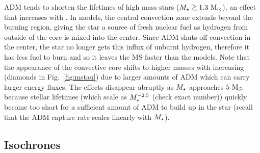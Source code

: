 \documentclass[useAMS,usenatbib]{mnras}
\begin{document}
ADM tends to shorten the lifetimes of high mass stars ($M_{\star} \gtrsim 1.3 \ \mathrm{M}_{\odot}$), an effect that increases with \gammaB. In \nodm models, the central convection zone extends beyond the burning region, giving the star a source of fresh nuclear fuel as hydrogen from outside of the core is mixed into the center. Since ADM shuts off convection in the center, the star no longer gets this influx of unburnt hydrogen, therefore it has less fuel to burn and so it leaves the MS faster than the \nodm models. Note that the appearance of the convective core shifts to higher masses with increasing \gammaB (diamonds in Fig.~\ref{fig:mstau}) due to larger amounts of ADM which can carry larger energy fluxes. The effects disappear abruptly as $M_{\star}$ approaches $5 \ \mathrm{M}_{\odot}$ because stellar lifetimes (which scale as $M_{\star}^{-2.5}$ (check exact number)) quickly become too short for a sufficient amount of ADM to build up in the star (recall that the ADM capture rate scales linearly with $M_{\star}$).


\subsection{Isochrones}
\label{sub:isochrones}
\end{document}
